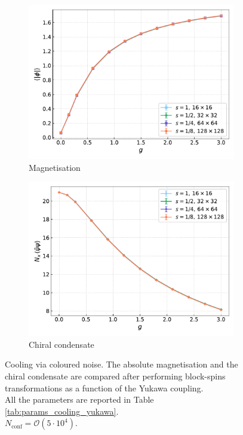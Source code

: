 \begin{figure}[hbp]
    \centering
    \begin{subfigure}[b]{0.47\textwidth}
        \includegraphics[width=\textwidth]{figures/cooling/yukawa_scan/magnetisation.pdf}
        \caption{Magnetisation}
    \end{subfigure}
    \hfill
    \begin{subfigure}[b]{0.47\textwidth}
        \includegraphics[width=\textwidth]{figures/cooling/yukawa_scan/condensate.pdf}
        \caption{Chiral condensate}
    \end{subfigure}
    \caption[Cooling stochastic quantisation: fields as a function of the Yukawa coupling.]{Cooling via coloured noise. The absolute magnetisation and the chiral condensate are compared after performing block-spins transformations as a function of the Yukawa coupling. \\ All the parameters are reported in  Table \ref{tab:params_cooling_yukawa}. \\$N_\text{conf} = \mathcal{O}(5 \cdot 10^4)$. }
    \label{fig:cooling_M_psibarpsi}
\end{figure}
